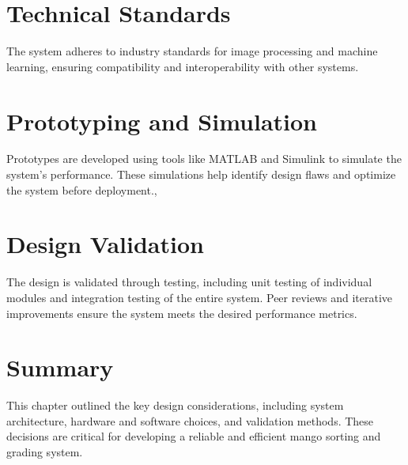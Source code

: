 \section{Technical Standards}
The system adheres to industry standards for image processing and machine learning, ensuring compatibility and interoperability with other systems.

\section{Prototyping and Simulation}
Prototypes are developed using tools like MATLAB and Simulink to simulate the system’s performance. These simulations help identify design flaws and optimize the system before deployment.,

\section{Design Validation}
The design is validated through testing, including unit testing of individual modules and integration testing of the entire system. Peer reviews and iterative improvements ensure the system meets the desired performance metrics.

\section{Summary}
This chapter outlined the key design considerations, including system architecture, hardware and software choices, and validation methods. These decisions are critical for developing a reliable and efficient mango sorting and grading system.


